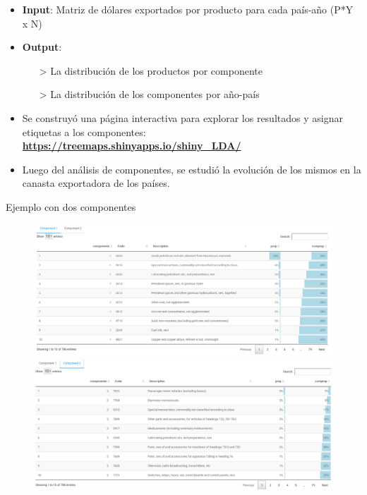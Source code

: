 \documentclass[compress]{beamer}
\begin{document}
\begin{frame}

\begin{itemize}[label=\faRebel]
	\item \textbf{Input}: Matriz de dólares exportados por producto para cada país-año (P*Y x N)
	\item \textbf{Output}:
	\begin{itemize}
		\item[>] La distribución de los productos por componente
		\item[>] La distribución de los componentes por año-país
	\end{itemize}
	
	\item Se construyó una página interactiva para explorar los resultados y asignar etiquetas a los componentes: \textbf{\url{https://treemaps.shinyapps.io/shiny_LDA/}}
	\item Luego del análisis de componentes, se estudió la evolución de los mismos en la canasta exportadora de los países.

\end{itemize}
\end{frame}


\begin{frame}
\tiny Ejemplo con dos componentes
\begin{figure}
	\centering
	\includegraphics[width=0.8\linewidth]{comp1k2}
	\includegraphics[width=0.8\linewidth]{comp2k2}	
\end{figure}

\end{frame}
\end{document}
